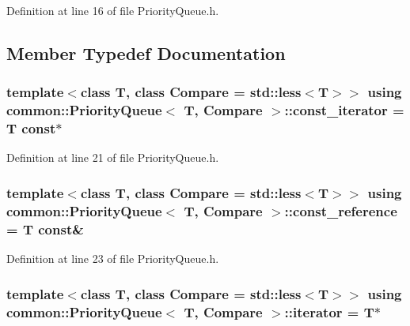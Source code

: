 Definition at line 16 of file Priority\+Queue.\+h.



\subsection{Member Typedef Documentation}
\subsubsection[{\texorpdfstring{const\+\_\+iterator}{const_iterator}}]{\setlength{\rightskip}{0pt plus 5cm}template$<$class T, class Compare = std\+::less$<$\+T$>$$>$ using {\bf common\+::\+Priority\+Queue}$<$ T, Compare $>$\+::{\bf const\+\_\+iterator} =  T const$\ast$}\hypertarget{classcommon_1_1PriorityQueue_ad22a4ff01afbdd1ab13ebffa8c61c924}{}\label{classcommon_1_1PriorityQueue_ad22a4ff01afbdd1ab13ebffa8c61c924}


Definition at line 21 of file Priority\+Queue.\+h.

\subsubsection[{\texorpdfstring{const\+\_\+reference}{const_reference}}]{\setlength{\rightskip}{0pt plus 5cm}template$<$class T, class Compare = std\+::less$<$\+T$>$$>$ using {\bf common\+::\+Priority\+Queue}$<$ T, Compare $>$\+::{\bf const\+\_\+reference} =  T const\&}\hypertarget{classcommon_1_1PriorityQueue_ae9270b1553c1337f99508699590ee7c0}{}\label{classcommon_1_1PriorityQueue_ae9270b1553c1337f99508699590ee7c0}


Definition at line 23 of file Priority\+Queue.\+h.

\subsubsection[{\texorpdfstring{iterator}{iterator}}]{\setlength{\rightskip}{0pt plus 5cm}template$<$class T, class Compare = std\+::less$<$\+T$>$$>$ using {\bf common\+::\+Priority\+Queue}$<$ T, Compare $>$\+::{\bf iterator} =  T$\ast$}\hypertarget{classcommon_1_1PriorityQueue_ab537c372fee0c15e7d6319fac2fc8a62}{}\label{classcommon_1_1PriorityQueue_ab537c372fee0c15e7d6319fac2fc8a62}


